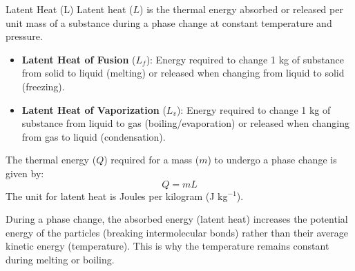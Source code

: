 \begin{keyconcept}{Latent Heat (L)}
Latent heat (\(L\)) is the thermal energy absorbed or released per unit mass of a substance during a phase change at constant temperature and pressure.
\begin{itemize}
    \item \textbf{Latent Heat of Fusion} (\(L_f\)): Energy required to change 1 kg of substance from solid to liquid (melting) or released when changing from liquid to solid (freezing).
    \item \textbf{Latent Heat of Vaporization} (\(L_v\)): Energy required to change 1 kg of substance from liquid to gas (boiling/evaporation) or released when changing from gas to liquid (condensation).
\end{itemize}
The thermal energy (\(Q\)) required for a mass (\(m\)) to undergo a phase change is given by:
\begin{equation}
Q = mL
\label{eq:latent_heat}
\end{equation}
The unit for latent heat is Joules per kilogram (J kg\(^{-1}\)).
\end{keyconcept}





During a phase change, the absorbed energy (latent heat) increases the potential energy of the particles (breaking intermolecular bonds) rather than their average kinetic energy (temperature). This is why the temperature remains constant during melting or boiling.

